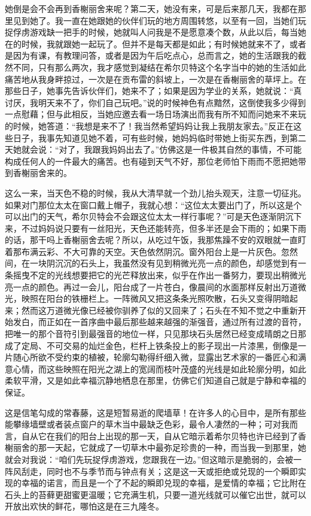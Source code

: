 \par 她倒是会不会再到香榭丽舍来呢？第二天，她没有来，可是后来那几天，我都在那里见到她了。我一直在她跟她的伙伴们玩的地方周围转悠，以至有一回，当她们玩捉俘虏游戏缺一把手的时候，她就叫人问我是不是愿意凑个数，从此以后，每当她在的时候，我就跟她一起玩了。但并不是每天都是如此；有时候她就来不了，或者是因为有课，有教理问答，或者是因为午后吃点心，总而言之，她的生活跟我的截然不同，只有那么两次，我才感觉到凝结在希尔贝特这个名字当中的她的生活如此痛苦地从我身畔掠过，一次是在贡布雷的斜坡上，一次是在香榭丽舍的草坪上。在那些日子，她事先告诉伙伴们，她来不了；如果是因为学业的关系，她就说：“真讨厌，我明天来不了，你们自己玩吧。”说的时候神色有点黯然，这倒使我多少得到一点慰藉；但与此相反，当她应邀去看一场日场演出而我有所不知而问她来不来玩的时候，她答道：“我想是来不了！我当然希望妈妈让我上我朋友家去。”反正在这些日子，我事先知道见她不着，可有些时候，她妈妈临时带她上街买东西，到第二天她就会说：“对了，我跟我妈妈出去了。”仿佛这是一件极其自然的事情，不可能构成任何人的一件最大的痛苦。也有碰到天气不好，那位老师怕下雨而不愿把她带到香榭丽舍来的。
\par 这么一来，当天色不稳的时候，我从大清早就一个劲儿抬头观天，注意一切征兆。如果对门那位太太在窗口戴上帽子，我就心想：“这位太太要出门了，所以这是个可以出门的天气，希尔贝特会不会跟这位太太一样行事呢？”可是天色逐渐阴沉下来，不过妈妈说只要有一丝阳光，天色还能转亮，但多半还是会下雨的；如果下雨的话，那干吗上香榭丽舍去呢？所以，从吃过午饭，我那焦躁不安的双眼就一直盯着那布满云彩、不大可靠的天空。天色依然阴沉。窗外阳台上是一片灰色。忽然间，在一块阴沉沉的石头上，我虽然没有见到稍微光亮一点的颜色，却感觉到有一条摇曳不定的光线想要把它的光芒释放出来，似乎在作出一番努力，要现出稍微光亮一点的颜色。再过一会儿，阳台成了一片苍白，像晨间的水面那样反射出万道微光，映照在阳台的铁栅栏上。一阵微风又把这条条光照吹散，石头又变得阴暗起来；然而这万道微光像已经被你驯养了似的又回来了；石头在不知不觉之中重新开始发白，而正如在一首序曲中最后那些越来越强的渐强音，通过所有过渡的音符，把唯一的那个音符引到最强音的地位一样，只见那块石头居然已经变成晴朗之日那成了定局、不可交易的灿烂金色，栏杆上铁条投上的影子现出一片漆黑，倒像是一片随心所欲不受约束的植被，轮廓勾勒得纤细入微，显露出艺术家的一番匠心和满意心情，而这些映照在阳光之湖上的宽阔而枝叶茂盛的光线是如此轮廓分明，如此柔软平滑，又是如此幸福沉静地栖息在那里，仿佛它们知道自己就是宁静和幸福的保证。
\par 这是信笔勾成的常春藤，这是短暂易逝的爬墙草！在许多人的心目中，是所有那些能攀缘墙壁或者装点窗户的草木当中最缺乏色彩，最令人凄然的一种；可对我而言，自从它在我们的阳台上出现的那一天，自从它暗示着希尔贝特也许已经到了香榭丽舍的那一天起，它就成了一切草木中最弥足珍贵的一种，而当我一到那里，她就会对我说：“咱们先玩捉俘虏游戏，您跟我在一边。”但这暗示是脆弱的，会被一阵风刮走，同时也不与季节而与钟点有关；这是这一天或拒绝或兑现的一个瞬即实现的幸福的诺言，而且是一个了不起的瞬即兑现的幸福，是爱情的幸福；它比附在石头上的苔藓更甜蜜更温暖；它充满生机，只要一道光线就可以催它出世，就可以开放出欢快的鲜花，哪怕这是在三九隆冬。
